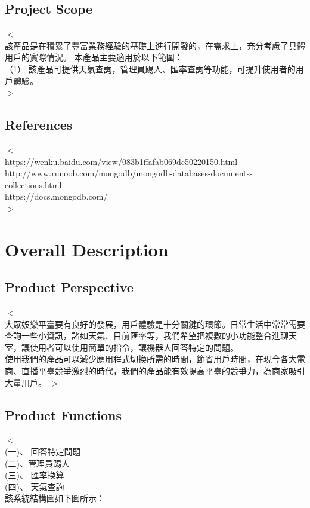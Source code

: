 \documentclass{scrreprt}
\begin{document}
\begin{CJK}{UTF8}{bkai}
\section{Project Scope}
$<$\\該產品是在積累了豐富業務經驗的基礎上進行開發的，在需求上，充分考慮了具體用戶的實際情況。 本產品主要適用於以下範圍：\\
（1）	該產品可提供天氣查詢，管理員踢人、匯率查詢等功能，可提升使用者的用戶體驗。\\

$>$

\section{References}
$<$\\
https://wenku.baidu.com/view/083b1ffafab069dc50220150.html\\
http://www.runoob.com/mongodb/mongodb-databases-documents-collections.html\\
https://docs.mongodb.com/\\
$>$


\chapter{Overall Description}

\section{Product Perspective}
$<$\\大眾娛樂平臺要有良好的發展，用戶體驗是十分關鍵的環節。日常生活中常常需要查詢一些小資訊，諸如天氣、目前匯率等，我們希望把複數的小功能整合進聊天室，讓使用者可以使用簡單的指令，讓機器人回答特定的問題。\\
使用我們的產品可以減少應用程式切換所需的時間，節省用戶時間，在現今各大電商、直播平臺競爭激烈的時代，我們的產品能有效提高平臺的競爭力，為商家吸引大量用戶。
$>$

\section{Product Functions}
$<$\\(一)、 回答特定問題\\
(二)、管理員踢人  \\
(三)、  匯率換算\\
(四)、 天氣查詢\\
該系統結構圖如下圖所示：



\end{CJK}
\end{document}
